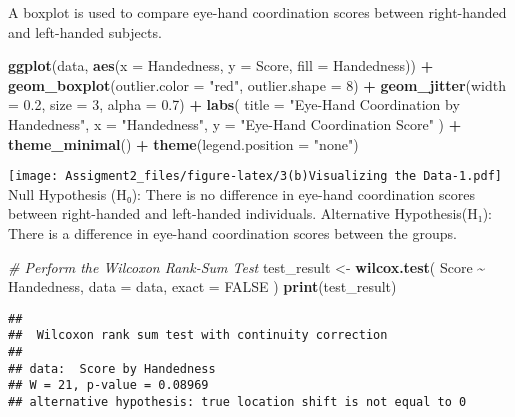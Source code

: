 \documentclass[
]{article}
\newenvironment{Shaded}{\begin{snugshade}}{\end{snugshade}}
\newcommand{\AttributeTok}[1]{\textcolor[rgb]{0.13,0.29,0.53}{#1}}
\newcommand{\CommentTok}[1]{\textcolor[rgb]{0.56,0.35,0.01}{\textit{#1}}}
\newcommand{\ConstantTok}[1]{\textcolor[rgb]{0.56,0.35,0.01}{#1}}
\newcommand{\DecValTok}[1]{\textcolor[rgb]{0.00,0.00,0.81}{#1}}
\newcommand{\FloatTok}[1]{\textcolor[rgb]{0.00,0.00,0.81}{#1}}
\newcommand{\FunctionTok}[1]{\textcolor[rgb]{0.13,0.29,0.53}{\textbf{#1}}}
\newcommand{\NormalTok}[1]{#1}
\newcommand{\OtherTok}[1]{\textcolor[rgb]{0.56,0.35,0.01}{#1}}
\newcommand{\SpecialCharTok}[1]{\textcolor[rgb]{0.81,0.36,0.00}{\textbf{#1}}}
\newcommand{\StringTok}[1]{\textcolor[rgb]{0.31,0.60,0.02}{#1}}
\begin{document}
A boxplot is used to compare eye-hand coordination scores between
right-handed and left-handed subjects.

\begin{Shaded}
\begin{Highlighting}[]
\FunctionTok{ggplot}\NormalTok{(data, }\FunctionTok{aes}\NormalTok{(}\AttributeTok{x =}\NormalTok{ Handedness, }\AttributeTok{y =}\NormalTok{ Score, }\AttributeTok{fill =}\NormalTok{ Handedness)) }\SpecialCharTok{+}
  \FunctionTok{geom\_boxplot}\NormalTok{(}\AttributeTok{outlier.color =} \StringTok{"red"}\NormalTok{, }\AttributeTok{outlier.shape =} \DecValTok{8}\NormalTok{) }\SpecialCharTok{+}
  \FunctionTok{geom\_jitter}\NormalTok{(}\AttributeTok{width =} \FloatTok{0.2}\NormalTok{, }\AttributeTok{size =} \DecValTok{3}\NormalTok{, }\AttributeTok{alpha =} \FloatTok{0.7}\NormalTok{) }\SpecialCharTok{+}
  \FunctionTok{labs}\NormalTok{(}
    \AttributeTok{title =} \StringTok{"Eye{-}Hand Coordination by Handedness"}\NormalTok{,}
    \AttributeTok{x =} \StringTok{"Handedness"}\NormalTok{,}
    \AttributeTok{y =} \StringTok{"Eye{-}Hand Coordination Score"}
\NormalTok{  ) }\SpecialCharTok{+}
  \FunctionTok{theme\_minimal}\NormalTok{() }\SpecialCharTok{+}
  \FunctionTok{theme}\NormalTok{(}\AttributeTok{legend.position =} \StringTok{"none"}\NormalTok{)}
\end{Highlighting}
\end{Shaded}

\texttt{[image: Assigment2\_files/figure-latex/3(b)Visualizing the Data-1.pdf]}
Null Hypothesis (H₀): There is no difference in eye-hand coordination
scores between right-handed and left-handed individuals. Alternative
Hypothesis(H₁): There is a difference in eye-hand coordination scores
between the groups.

\begin{Shaded}
\begin{Highlighting}[]
\CommentTok{\# Perform the Wilcoxon Rank{-}Sum Test}
\NormalTok{test\_result }\OtherTok{\textless{}{-}} \FunctionTok{wilcox.test}\NormalTok{(}
\NormalTok{  Score }\SpecialCharTok{\textasciitilde{}}\NormalTok{ Handedness,}
  \AttributeTok{data =}\NormalTok{ data,}
  \AttributeTok{exact =} \ConstantTok{FALSE}
\NormalTok{)}
\FunctionTok{print}\NormalTok{(test\_result)}
\end{Highlighting}
\end{Shaded}

\begin{verbatim}
## 
##  Wilcoxon rank sum test with continuity correction
## 
## data:  Score by Handedness
## W = 21, p-value = 0.08969
## alternative hypothesis: true location shift is not equal to 0
\end{verbatim}
\end{document}
